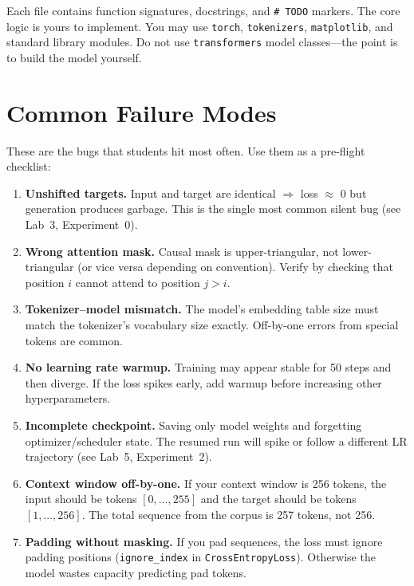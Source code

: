 \noindent Each file contains function signatures, docstrings, and \texttt{\# TODO} markers. The core logic is yours to implement. You may use \texttt{torch}, \texttt{tokenizers}, \texttt{matplotlib}, and standard library modules. Do not use \texttt{transformers} model classes---the point is to build the model yourself.


\section*{Common Failure Modes}

These are the bugs that students hit most often. Use them as a pre-flight checklist:

\begin{enumerate}[nosep]
  \item \textbf{Unshifted targets.} Input and target are identical $\Rightarrow$ loss $\approx$ 0 but generation produces garbage. This is the single most common silent bug (see Lab~3, Experiment~0).

  \item \textbf{Wrong attention mask.} Causal mask is upper-triangular, not lower-triangular (or vice versa depending on convention). Verify by checking that position $i$ cannot attend to position $j > i$.

  \item \textbf{Tokenizer--model mismatch.} The model's embedding table size must match the tokenizer's vocabulary size exactly. Off-by-one errors from special tokens are common.

  \item \textbf{No learning rate warmup.} Training may appear stable for 50 steps and then diverge. If the loss spikes early, add warmup before increasing other hyperparameters.

  \item \textbf{Incomplete checkpoint.} Saving only model weights and forgetting optimizer/scheduler state. The resumed run will spike or follow a different LR trajectory (see Lab~5, Experiment~2).

  \item \textbf{Context window off-by-one.} If your context window is 256 tokens, the input should be tokens $[0, \ldots, 255]$ and the target should be tokens $[1, \ldots, 256]$. The total sequence from the corpus is 257 tokens, not 256.

  \item \textbf{Padding without masking.} If you pad sequences, the loss must ignore padding positions (\texttt{ignore\_index} in \texttt{CrossEntropyLoss}). Otherwise the model wastes capacity predicting pad tokens.
\end{enumerate}



